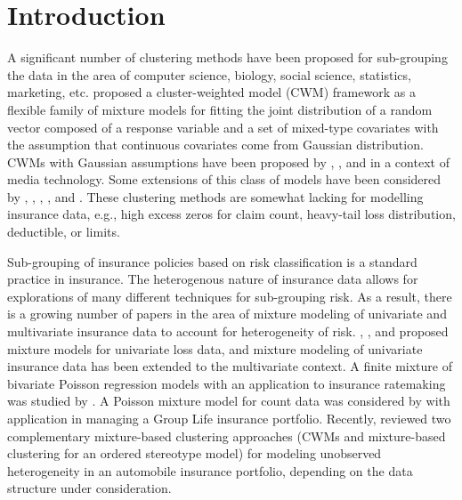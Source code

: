 \documentclass[12pt,letterpaper]{article}
\numberwithin{equation}{section}
\numberwithin{equation}{section}
\numberwithin{equation}{section}
\begin{document}
\section{Introduction}\label{sec:introduction}
A significant number of clustering methods have been proposed for sub-grouping the data in the area of computer science, biology, social science, statistics, marketing, etc. \cite{Ingrassia+Punzo+Vittadini+Minotti:2015} proposed a cluster-weighted model (CWM) framework as a flexible family of mixture models for fitting the joint distribution of a random vector composed of a response variable and a set of mixed-type covariates with the assumption that continuous covariates come from Gaussian distribution. CWMs with Gaussian assumptions have been proposed by \cite{Gershenfeld:1997}, \cite{Gershenfeld:Schoner+Metois:1999}, and \cite{Gershenfeld:1999} in a context of media technology. Some extensions of this class of models have been considered by \cite{Punzo+Ingrassia:2015}, \cite{Ingrassia+Minotti+Punzo:2014}, \cite{Ingrassia+Minotti+Vittadini:2012}, \cite{subedi13,subedi15}, and \cite{punzo17}. These clustering methods are somewhat lacking for modelling insurance data, e.g., high excess zeros for claim count, heavy-tail loss distribution, deductible, or limits.

Sub-grouping of insurance policies based on risk classification is a standard practice in insurance. The heterogenous nature of insurance data allows for explorations of many different techniques for sub-grouping risk. As a result, there is a growing number of papers in the area of mixture modeling of univariate and multivariate insurance data to account for heterogeneity of risk. \cite{Lee+Lin:2010}, \cite{Verbelen+Gong+Antonio+Badescu+Lin:2015}, and \cite{Miljkovic+Grun:2016} proposed mixture models for univariate loss data, and mixture modeling of univariate insurance data has been extended to the multivariate context. A finite mixture of bivariate Poisson regression models with an application to insurance ratemaking was studied by \cite{Bermudez+Karlis:2012}. A Poisson mixture model for count data was considered by \cite{Brown+Buckley:2015} with application in managing a Group Life insurance portfolio. Recently, \cite{risks_miljkovic} reviewed two complementary mixture-based clustering approaches (CWMs and mixture-based clustering for an ordered stereotype model) for modeling unobserved heterogeneity in an automobile insurance portfolio, depending on the data structure under consideration. 
\end{document}
